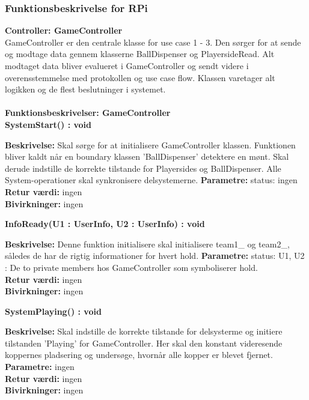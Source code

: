 \documentclass[Arkitektur/System_main.tex]{subfiles}
\begin{document}
\subsubsection{Funktionsbeskrivelse for RPi}
\large{\textbf{Controller:  GameController}}\\
GameController er den centrale klasse for use case 1 - 3. Den sørger for at sende og modtage data gennem klasserne BallDispenser og PlayersideRead. Alt modtaget data bliver evalueret i GameController og sendt videre i overensstemmelse med protokollen og use case flow. Klassen varetager alt logikken og de flest beslutninger i systemet.\\\\
{\large\textbf{Funktionsbeskrivelser: GameController}}\\[0.2cm]
\textbf{SystemStart() : void}
\begin{adjustwidth}{1cm}{0pt}
\textbf{Beskrivelse:} Skal sørge for at initialisere GameController klassen. Funktionen bliver kaldt når en boundary klassen 'BallDispenser' detektere en mønt. Skal derude indstille de korrekte tilstande for Playersides og BallDispenser. Alle System-operationer skal synkronisere delsystemerne.   
\textbf{Parametre:} status: ingen \\[0.2cm]
\textbf{Retur værdi:} ingen \\[0.2cm]
\textbf{Bivirkninger:} ingen \\[0.2cm]
\end{adjustwidth}
\textbf{InfoReady(U1 : UserInfo, U2 : UserInfo) : void}
\begin{adjustwidth}{1cm}{0pt}
\textbf{Beskrivelse:} Denne funktion initialisere skal initialisere team1\_ og team2\_, således de har de rigtig informationer for hvert hold. 
\textbf{Parametre:} status: U1, U2 : De to private members hos GameController som symboliserer hold.  \\[0.2cm]
\textbf{Retur værdi:} ingen \\[0.2cm]
\textbf{Bivirkninger:} ingen \\[0.2cm]
\end{adjustwidth}

\textbf{SystemPlaying() : void}
\begin{adjustwidth}{1cm}{0pt}
\textbf{Beskrivelse:} Skal indstille de korrekte tilstande for delsysterme og initiere tilstanden 'Playing' for GameController. Her skal den konstant videresende koppernes pladsering og undersøge, hvornår alle kopper er blevet fjernet. 
\textbf{Parametre:} ingen \\[0.2cm]
\textbf{Retur værdi:} ingen \\[0.2cm]
\textbf{Bivirkninger:} ingen \\[0.2cm]
\end{adjustwidth}
\end{document}
